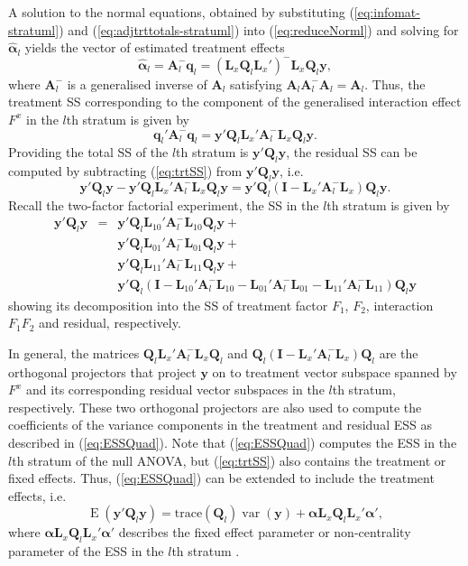 \documentclass[article]{jss}
\newcommand{\I}{\mathbf{I}}
\newcommand{\Q}{\mathbf{Q}}
\newcommand{\A}{\mathbf{A}}
\newcommand{\mL}{\mathbf{L}}
\begin{document}
A solution to the normal equations, obtained by substituting (\ref{eq:infomat-stratuml}) and (\ref{eq:adjtrttotals-stratuml}) into (\ref{eq:reduceNorml}) and solving for $\hat{\bm{\alpha}}_l$ yields the vector of estimated treatment effects
\begin{equation}
\label{eq:trtVec}
\hat{\bm{\alpha}}_l = \A_{l}^{-} \bm{q}_l = (\mL_{x} \Q_l \mL_{x}')^{-} \mL_{x} \Q_l\bm{y},
\end{equation}
where $\A_{l}^{-}$ is a generalised inverse of $\A_{l}$ satisfying $\A_{l} \A_{l}^{-} \A_{l} = \A_{l}$. Thus, the treatment SS corresponding to the component of the generalised interaction effect $F^{x}$ in the $l$th stratum is given by 
\begin{equation}
\label{eq:trtSS}
 \bm{q}_{l}' \A_{l}^{-} \bm{q}_{l} = \bm{y}'\Q_l \mL_{x}' \A_{l}^{-} \mL_{x} \Q_l\bm{y}.
\end{equation}
Providing the total SS of the $l$th stratum is $\bm{y}' \Q_l\bm{y}$, the residual SS can be computed by subtracting (\ref{eq:trtSS}) from $\bm{y}' \Q_l\bm{y}$, i.e.\ 
\begin{equation}
\label{eq:resSS}
\bm{y}' \Q_l\bm{y} - \bm{y}'\Q_l \mL_{x}' \A_{l}^{-} \mL_{x} \Q_l\bm{y} = \bm{y}'\Q_l ( \I - \mL_{x}' \A_{l}^{-} \mL_{x}) \Q_l\bm{y}.
\end{equation}
Recall the two-factor factorial experiment, the SS in the $l$th stratum is given by 
\begin{eqnarray}
\bm{y}'\Q_l \bm{y} &=& \bm{y}'\Q_l\mL_{10}' \A_{l}^{-} \mL_{10} \Q_l\bm{y} + \\
					&& \bm{y}'\Q_l\mL_{01}' \A_{l}^{-} \mL_{01} \Q_l\bm{y} + \\
					&& \bm{y}'\Q_l\mL_{11}' \A_{l}^{-} \mL_{11} \Q_l\bm{y} + \\
					&&\bm{y}'\Q_l(\I - \mL_{10}' \A_{l}^{-} \mL_{10} - \mL_{01}' \A_{l}^{-} \mL_{01} - \mL_{11}' \A_{l}^{-} \mL_{11}) \Q_l\bm{y}
\end{eqnarray}
showing its decomposition into the SS of treatment factor $F_1$, $F_2$, interaction $F_1F_2$ and residual, respectively. 

In general, the matrices $\Q_l \mL_{x}' \A_{l}^{-} \mL_{x} \Q_l$ and $\Q_l ( \I - \mL_{x}' \A_{l}^{-} \mL_{x}) \Q_l$ are the orthogonal projectors that project $\bm{y}$ on to treatment vector subspace spanned by $F^x$ and its corresponding residual vector subspaces in the $l$th stratum, respectively. These two orthogonal projectors are also used to compute the coefficients of the variance components in the treatment and residual ESS as described in (\ref{eq:ESSQuad}). Note that (\ref{eq:ESSQuad}) computes the ESS in the $l$th stratum of the null ANOVA, but (\ref{eq:trtSS}) also contains the treatment or fixed effects. Thus, (\ref{eq:ESSQuad}) can be extended to include the treatment effects, i.e.\  
\begin{equation}
\label{eq:ESSQuadTrt}
\operatorname{E}(\bm{y}'\Q_{l}\bm{y})= \mathrm{trace}(\Q_{l})\operatorname{var}(\bm{y}) + \bm{\alpha}\mL_{x}\Q_{l}\mL_{x}'\bm{\alpha}',
\end{equation}
where $\bm{\alpha}\mL_{x}\Q_{l}\mL_{x}'\bm{\alpha}'$ describes the fixed effect parameter or non-centrality parameter of the ESS in the $l$th stratum \citep{Searle1982}.
\end{document}

